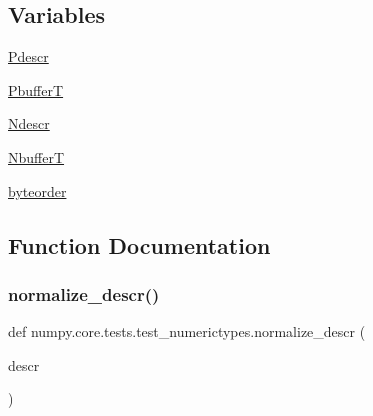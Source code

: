 \subsection*{Variables}
\begin{DoxyCompactItemize}
\item 
\hyperlink{namespacenumpy_1_1core_1_1tests_1_1test__numerictypes_a38306a22ba09175c1d54a3ea494b1f23}{Pdescr}
\item 
\hyperlink{namespacenumpy_1_1core_1_1tests_1_1test__numerictypes_ad10a2450098f6f6a154f5c841b425916}{PbufferT}
\item 
\hyperlink{namespacenumpy_1_1core_1_1tests_1_1test__numerictypes_afd8abe752c0a46f39b6cfc60c0fd839d}{Ndescr}
\item 
\hyperlink{namespacenumpy_1_1core_1_1tests_1_1test__numerictypes_a32e12971d2e5c1f8ae9409530f75d016}{NbufferT}
\item 
\hyperlink{namespacenumpy_1_1core_1_1tests_1_1test__numerictypes_aef4f8f9f4c0d0c4b65bedb76314030e6}{byteorder}
\end{DoxyCompactItemize}


\subsection{Function Documentation}
\mbox{\label{namespacenumpy_1_1core_1_1tests_1_1test__numerictypes_a0ec90a5a3a0afba8bed519e708093de8}} 
\subsubsection{\texorpdfstring{normalize\+\_\+descr()}{normalize\_descr()}}
{\footnotesize\ttfamily def numpy.\+core.\+tests.\+test\+\_\+numerictypes.\+normalize\+\_\+descr (\begin{DoxyParamCaption}\item[{}]{descr }\end{DoxyParamCaption})}

\mbox{\label{namespacenumpy_1_1core_1_1tests_1_1test__numerictypes_a2191a1a529be24ee047ddddcd3b1bb03}} 
